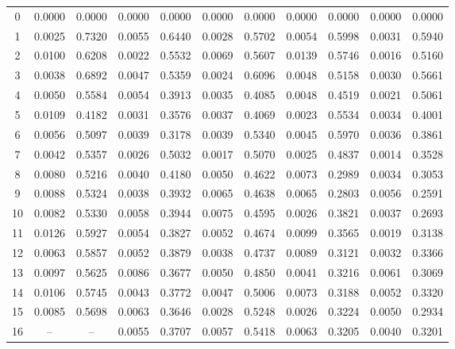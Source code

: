 \begin{table}[!htbp]
\begin{tabular}{c|cc|cc|cc|cc|cc}
0  & 0.0000 & 0.0000 & 0.0000 & 0.0000 & 0.0000 & 0.0000 & 0.0000 & 0.0000 & 0.0000 & 0.0000 \\
1  & 0.0025 & 0.7320 & 0.0055 & 0.6440 & 0.0028 & 0.5702 & 0.0054 & 0.5998 & 0.0031 & 0.5940 \\
2  & 0.0100 & 0.6208 & 0.0022 & 0.5532 & 0.0069 & 0.5607 & 0.0139 & 0.5746 & 0.0016 & 0.5160 \\
3  & 0.0038 & 0.6892 & 0.0047 & 0.5359 & 0.0024 & 0.6096 & 0.0048 & 0.5158 & 0.0030 & 0.5661 \\
4  & 0.0050 & 0.5584 & 0.0054 & 0.3913 & 0.0035 & 0.4085 & 0.0048 & 0.4519 & 0.0021 & 0.5061 \\
5  & 0.0109 & 0.4182 & 0.0031 & 0.3576 & 0.0037 & 0.4069 & 0.0023 & 0.5534 & 0.0034 & 0.4001 \\
6  & 0.0056 & 0.5097 & 0.0039 & 0.3178 & 0.0039 & 0.5340 & 0.0045 & 0.5970 & 0.0036 & 0.3861 \\
7  & 0.0042 & 0.5357 & 0.0026 & 0.5032 & 0.0017 & 0.5070 & 0.0025 & 0.4837 & 0.0014 & 0.3528 \\
8  & 0.0080 & 0.5216 & 0.0040 & 0.4180 & 0.0050 & 0.4622 & 0.0073 & 0.2989 & 0.0034 & 0.3053 \\
9  & 0.0088 & 0.5324 & 0.0038 & 0.3932 & 0.0065 & 0.4638 & 0.0065 & 0.2803 & 0.0056 & 0.2591 \\
10 & 0.0082 & 0.5330 & 0.0058 & 0.3944 & 0.0075 & 0.4595 & 0.0026 & 0.3821 & 0.0037 & 0.2693 \\
11 & 0.0126 & 0.5927 & 0.0054 & 0.3827 & 0.0052 & 0.4674 & 0.0099 & 0.3565 & 0.0019 & 0.3138 \\
12 & 0.0063 & 0.5857 & 0.0052 & 0.3879 & 0.0038 & 0.4737 & 0.0089 & 0.3121 & 0.0032 & 0.3366 \\
13 & 0.0097 & 0.5625 & 0.0086 & 0.3677 & 0.0050 & 0.4850 & 0.0041 & 0.3216 & 0.0061 & 0.3069 \\
14 & 0.0106 & 0.5745 & 0.0043 & 0.3772 & 0.0047 & 0.5006 & 0.0073 & 0.3188 & 0.0052 & 0.3320 \\
15 & 0.0085 & 0.5698 & 0.0063 & 0.3646 & 0.0028 & 0.5248 & 0.0026 & 0.3224 & 0.0050 & 0.2934 \\
16 & -- & -- & 0.0055 & 0.3707 & 0.0057 & 0.5418 & 0.0063 & 0.3205 & 0.0040 & 0.3201 \\


\end{tabular}
\end{table}
